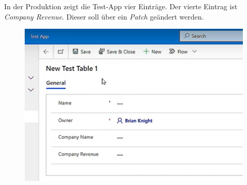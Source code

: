 In der Produktion zeigt die Test-App vier Einträge. Der vierte Eintrag ist \textit{Company Revenue}.  Dieser soll über ein \textit{Patch} geändert werden.
\begin{figure}[H]
	\centering
	\includegraphics[scale = 0.3]{attachment/chapter_13/Scc035}
\end{figure}

